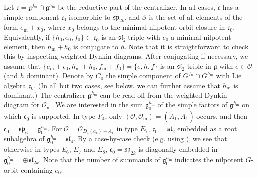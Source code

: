 \documentclass{amsart}
\newtheorem{lemma}[theorem]{Lemma}
\theoremstyle{definition}
\newcommand{\m}{\mathrm{m}}
\newcommand{\g}{\mathfrak{g}}
\newcommand{\cg}{\mathfrak{c}}
\newcommand{\0}{\mathcal{O}}
\begin{document}
Let $\cg=\g^{f_\m}\cap\g^{h_\m}$ be the reductive part of the centralizer.
In all cases, $\cg$ has a simple component $\cg_0$ isomorphic to $\mathfrak{sp}_{2k}$, and ${\mathcal S}$ is the set of all elements of the form $e_\m+x_0$, where $x_0$ belongs to the minimal nilpotent orbit closure in $\cg_0$.
Equivalently, if $\{ h_0,e_0,f_0\}\subset\cg_0$ is an $\mathfrak{sl}_2$-triple with $e_0$ a minimal nilpotent element, then $h_\m+h_0$ is conjugate to $h$.
Note that it is straightforward to check this by inspecting weighted Dynkin diagrams.
After conjugating if necessary, we assume that $\{e_\m+e_0, h_\m+h_0, f_\m+f_0\}=\{ e,h,f\}$ is an $\mathfrak{sl}_2$-triple in $\g$ with $e\in\0$ (and $h$ dominant).
Denote by $C_0$ the simple component of $G^{f_\m}\cap G^{h_\m}$ with Lie algebra $\cg_0$.
(In all but two cases, see below, we can further assume that $h_\m$ is dominant.)
The centralizer $\g^{h_\m}$ can be read off from the weighted Dynkin diagram for $\0_\m$.
We are interested in the sum $\g^{h_\m}_0$ of the simple factors of $\g^{h_\m}$ on which $\cg_0$ is supported.
In type $F_4$, only $(\0,\0_\m)=(\tilde{A}_1,A_1)$ occurs, and then $\cg_0=\mathfrak{sp}_6=\g^{h_\m}_0$.
For $\0=\0_{D_4(a_1)+A_1}$ in type $E_7$, $\cg_0=\mathfrak{sl}_2$ embedded as a root subalgebra of $\g^{h_\m}_0=\mathfrak{sl}_4$.
By a case-by-case check (e.g. using \cite{Lawther-Testerman}), we see that otherwise in types $E_6$, $E_7$ and $E_8$, $\cg_0=\mathfrak{sp}_{2k}$ is diagonally embedded in $\g^{h_\m}_0=\oplus \mathfrak{sl}_{2k}$.
Note that the number of summands of $\g^{h_\m}_0$ indicates the nilpotent $G$-orbit containing $e_0$.


\end{document}
